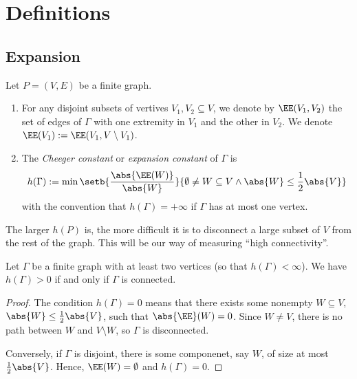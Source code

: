 \section{Definitions}

\subsection{Expansion}


\begin{definition}
    Let $P = (V ,E)$ be a finite graph.
    \begin{enumerate}[(1)]
        \item For any disjoint subsets of vertives $V_1,V_2 \subseteq V$, 
        we denote by $\EE(V_1, V_2)$ the set of edges of $\Gamma$ with 
        one extremity in $V_1$ and the other in $V_2$. 
        We denote $\EE(V_1) := \EE(V_1, V \setminus V_1)$.
        \item The \emph{Cheeger constant} or \emph{expansion constant} 
        of $\Gamma$ is
        \[
            h(\Gamma) := \min\setb{\frac{\abs{\EE(W)}}{\abs{W}}}
            {\emptyset \neq W \subseteq V \land \abs{W} \le \frac{1}{2}\abs{V}}
        \]
        with the convention that $h(\Gamma) = +\infty$ if $\Gamma$ has 
        at most one vertex.
    \end{enumerate}
\end{definition}

The larger $h(P)$ is, the more difficult it is to disconnect a large subset of $V$ from 
the rest of the graph. This will be our way of measuring ``high connectivity''.

\begin{lemma}
    Let $\Gamma$ be a finite graph with at least two vertices (so that $h(\Gamma) < \infty$).
    We have $h(\Gamma) > 0$ if and only if $\Gamma$ is connected.
\end{lemma}

\begin{proof}
    The condition $h(\Gamma) = 0$ means that there exists some nonempty $W \subseteq V$, 
    $\abs{W} \le \frac{1}{2}\abs{V}$, such that $\abs{\EE}(W) = 0$. Since $W \neq V$,
    there is no path between $W$ and $V \setminus W$, so $\Gamma$ is disconnected.
    
    Conversely, if $\Gamma$ is disjoint, there is some componenet, say $W$, of size 
    at most $\frac{1}{2} \abs{V}$. Hence, $\EE(W) = \emptyset$ and $h(\Gamma) = 0$.
\end{proof}

